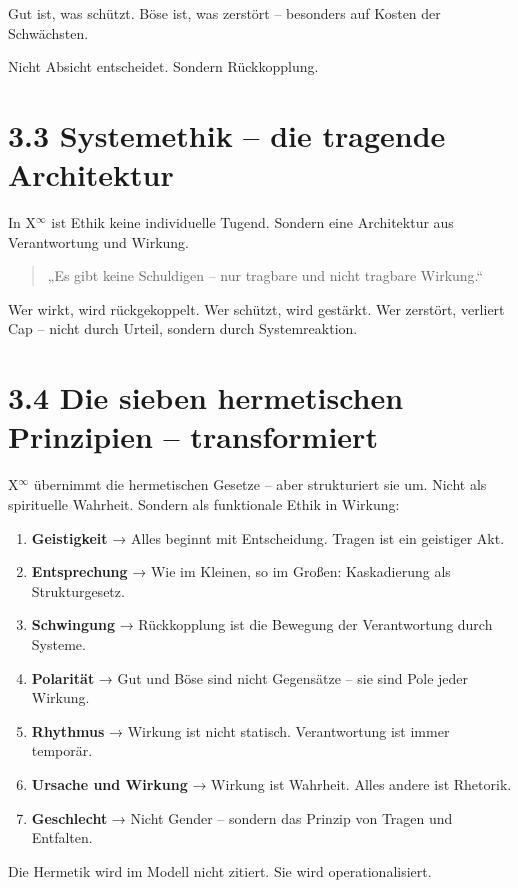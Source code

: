 \documentclass[12pt,a4paper]{book}
\begin{document}
Gut ist, was schützt.  
Böse ist, was zerstört – besonders auf Kosten der Schwächsten.

Nicht Absicht entscheidet.  
Sondern Rückkopplung.

\section*{3.3 Systemethik – die tragende Architektur}

In X$^\infty$ ist Ethik keine individuelle Tugend.  
Sondern eine Architektur aus Verantwortung und Wirkung.

\begin{quote}
„Es gibt keine Schuldigen – nur tragbare und nicht tragbare Wirkung.“
\end{quote}

Wer wirkt, wird rückgekoppelt. Wer schützt, wird gestärkt.  
Wer zerstört, verliert Cap – nicht durch Urteil, sondern durch Systemreaktion.

\section*{3.4 Die sieben hermetischen Prinzipien – transformiert}

X$^\infty$ übernimmt die hermetischen Gesetze – aber strukturiert sie um.  
Nicht als spirituelle Wahrheit. Sondern als funktionale Ethik in Wirkung:

\begin{enumerate}
    \item \textbf{Geistigkeit} → Alles beginnt mit Entscheidung. Tragen ist ein geistiger Akt.
    \item \textbf{Entsprechung} → Wie im Kleinen, so im Großen: Kaskadierung als Strukturgesetz.
    \item \textbf{Schwingung} → Rückkopplung ist die Bewegung der Verantwortung durch Systeme.
    \item \textbf{Polarität} → Gut und Böse sind nicht Gegensätze – sie sind Pole jeder Wirkung.
    \item \textbf{Rhythmus} → Wirkung ist nicht statisch. Verantwortung ist immer temporär.
    \item \textbf{Ursache und Wirkung} → Wirkung ist Wahrheit. Alles andere ist Rhetorik.
    \item \textbf{Geschlecht} → Nicht Gender – sondern das Prinzip von Tragen und Entfalten.
\end{enumerate}

Die Hermetik wird im Modell nicht zitiert. Sie wird operationalisiert.
\end{document}
